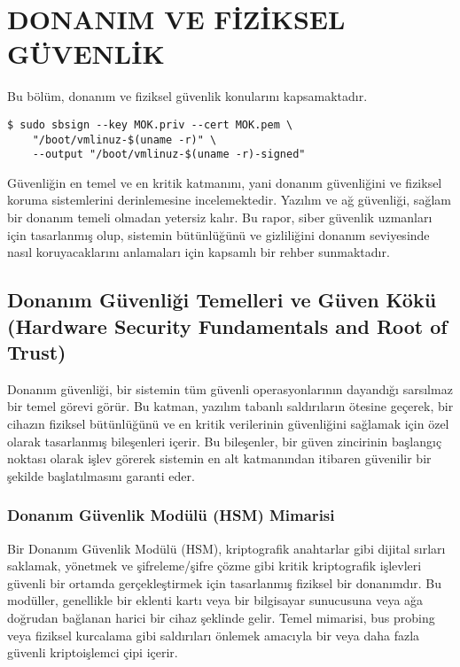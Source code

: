 \chapter{DONANIM VE FİZİKSEL GÜVENLİK}

Bu bölüm, donanım ve fiziksel güvenlik konularını kapsamaktadır.
    \begin{lstlisting}[breaklines=true,basicstyle=\ttfamily\footnotesize]
$ sudo sbsign --key MOK.priv --cert MOK.pem \
    "/boot/vmlinuz-$(uname -r)" \
    --output "/boot/vmlinuz-$(uname -r)-signed"
    \end{lstlisting}

Güvenliğin en temel ve en kritik katmanını, yani donanım güvenliğini ve fiziksel koruma sistemlerini derinlemesine incelemektedir. Yazılım ve ağ güvenliği, sağlam bir donanım temeli olmadan yetersiz kalır. Bu rapor, siber güvenlik uzmanları için tasarlanmış olup, sistemin bütünlüğünü ve gizliliğini donanım seviyesinde nasıl koruyacaklarını anlamaları için kapsamlı bir rehber sunmaktadır.

\section{Donanım Güvenliği Temelleri ve Güven Kökü (Hardware Security Fundamentals and Root of Trust)}

Donanım güvenliği, bir sistemin tüm güvenli operasyonlarının dayandığı sarsılmaz bir temel görevi görür. Bu katman, yazılım tabanlı saldırıların ötesine geçerek, bir cihazın fiziksel bütünlüğünü ve en kritik verilerinin güvenliğini sağlamak için özel olarak tasarlanmış bileşenleri içerir. Bu bileşenler, bir güven zincirinin başlangıç noktası olarak işlev görerek sistemin en alt katmanından itibaren güvenilir bir şekilde başlatılmasını garanti eder.

\subsection{Donanım Güvenlik Modülü (HSM) Mimarisi}

Bir Donanım Güvenlik Modülü (HSM), kriptografik anahtarlar gibi dijital sırları saklamak, yönetmek ve şifreleme/şifre çözme gibi kritik kriptografik işlevleri güvenli bir ortamda gerçekleştirmek için tasarlanmış fiziksel bir donanımdır. Bu modüller, genellikle bir eklenti kartı veya bir bilgisayar sunucusuna veya ağa doğrudan bağlanan harici bir cihaz şeklinde gelir. Temel mimarisi, bus probing veya fiziksel kurcalama gibi saldırıları önlemek amacıyla bir veya daha fazla güvenli kriptoişlemci çipi içerir.

